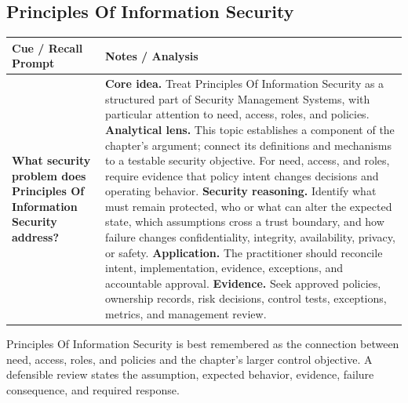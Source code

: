 \documentclass[11pt]{article}
\newcommand{\CornellHeader}{%
\rowcolor{Navy}\color{white}\bfseries Cue / Recall Prompt & \color{white}\bfseries Notes / Analysis\\\hline}
\newcommand{\CornellRow}[2]{%
\cellcolor{CueGray}\RaggedRight\textbf{#1} & \RaggedRight #2\\\hline}
\begin{document}
\subsection*{Principles Of Information Security}
\begin{longtable}{>{\RaggedRight\arraybackslash}p{}|>{\RaggedRight\arraybackslash}p{}}
\CornellHeader
\CornellRow{What security problem does Principles Of Information Security address?}{\textbf{Core idea.} Treat Principles Of Information Security as a structured part of Security Management Systems, with particular attention to need, access, roles, and policies. \textbf{Analytical lens.} This topic establishes a component of the chapter's argument; connect its definitions and mechanisms to a testable security objective. For need, access, and roles, require evidence that policy intent changes decisions and operating behavior. \textbf{Security reasoning.} Identify what must remain protected, who or what can alter the expected state, which assumptions cross a trust boundary, and how failure changes confidentiality, integrity, availability, privacy, or safety. \textbf{Application.} The practitioner should reconcile intent, implementation, evidence, exceptions, and accountable approval. \textbf{Evidence.} Seek approved policies, ownership records, risk decisions, control tests, exceptions, metrics, and management review.}
\end{longtable}
\begin{topicsummary}
Principles Of Information Security is best remembered as the connection between need, access, roles, and policies and the chapter's larger control objective. A defensible review states the assumption, expected behavior, evidence, failure consequence, and required response.
\end{topicsummary}
\end{document}
